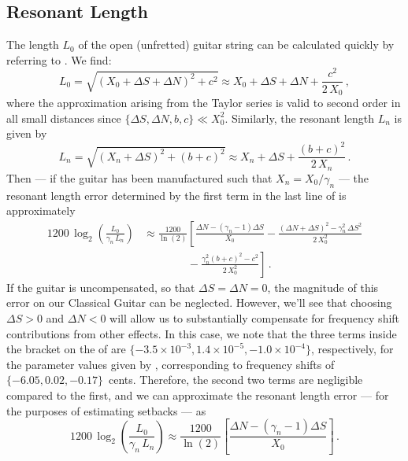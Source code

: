  \subsection{Resonant Length}
The length $L_0$ of the open (unfretted) guitar string can be calculated quickly by referring to . We find:
 \begin{equation}  \label{eqn:l_0_def}
L_0 = \sqrt{\left(X_0 + \Delta S + \Delta N\right)^2 + c^2} \approx X_0 + \Delta S + \Delta N + \frac{c^2}{2\, X_0}\, ,
 \end{equation}
where the approximation arising from the Taylor series is valid to second order in all small distances since $\{\Delta S, \Delta N, b, c\} \ll X_0^2$. Similarly, the resonant length $L_n$ is given by
 \begin{equation}  \label{eqn:l_n_def}
L_n = \sqrt{\left(X_n + \Delta S\right)^2 + (b + c)^2} \approx X_n + \Delta S + \frac{(b + c)^2}{2\, X_n}\, .
 \end{equation}
Then --- if the guitar has been manufactured such that $X_n = X_0 / \gamma_n$ --- the resonant length error determined by the first term in the last line of  is approximately
\begin{equation} \label{eqn:rle_taylor}
  \begin{split}
    1200\, \log_2 \left( \frac{L_0}{\gamma_n\, L_n} \right) &\approx \frac{1200}{\ln(2)} \left[ \frac{\Delta N - \left(\gamma_n - 1\right) \Delta S}{X_0} - \frac{(\Delta N + \Delta S)^2 - \gamma_n^2\, \Delta S^2}{2\, X_0^2}\right. \\ &\qquad\qquad - \left. \frac{\gamma_n^2 (b + c)^2 - c^2}{2\, X_0^2}\right]\, .
  \end{split}
\end{equation}
If the guitar is uncompensated, so that $\Delta S = \Delta N = 0$, the magnitude of this error on our Classical Guitar can be neglected. However, we'll see that choosing $\Delta S > 0$ and $\Delta N < 0$ will allow us to substantially compensate for frequency shift contributions from other effects. In this case, we note that the three terms inside the bracket on the \rhs of  are $\{-3.5 \times 10^{-3}, 1.4 \times 10^{-5}, -1.0 \times 10^{-4}\}$, respectively, for the parameter values given by , corresponding to frequency shifts of $\{-6.05, 0.02, -0.17\}$~cents. Therefore, the second two terms are negligible compared to the first, and we can approximate the resonant length error --- for the purposes of estimating setbacks --- as
\begin{equation} \label{eqn:rle_approx}
  1200\, \log_2 \left( \frac{L_0}{\gamma_n\, L_n} \right) \approx \frac{1200}{\ln(2)} \left[ \frac{\Delta N - \left(\gamma_n - 1\right) \Delta S}{X_0}\right]\, .
\end{equation}

